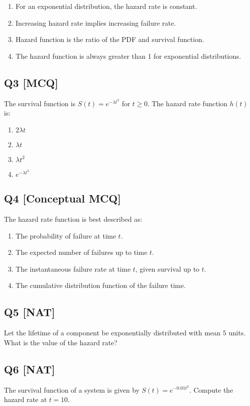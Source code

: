 \begin{enumerate}[label=(\alph*)]
\item For an exponential distribution, the hazard rate is constant.
\item Increasing hazard rate implies increasing failure rate.
\item Hazard function is the ratio of the PDF and survival function.
\item The hazard function is always greater than 1 for exponential distributions.
\end{enumerate}

\subsection*{Q3 [MCQ]}
The survival function is $S(t) = e^{-\lambda t^2}$ for $t \geq 0$. The hazard rate function $h(t)$ is:

\begin{enumerate}[label=(\alph*)]
\item $2\lambda t$
\item $\lambda t$
\item $\lambda t^2$
\item $e^{-\lambda t^2}$
\end{enumerate}

\subsection*{Q4 [Conceptual MCQ]}
The hazard rate function is best described as:

\begin{enumerate}[label=(\alph*)]
\item The probability of failure at time $t$.
\item The expected number of failures up to time $t$.
\item The instantaneous failure rate at time $t$, given survival up to $t$.
\item The cumulative distribution function of the failure time.
\end{enumerate}

\subsection*{Q5 [NAT]}
Let the lifetime of a component be exponentially distributed with mean $5$ units. What is the value of the hazard rate?

\subsection*{Q6 [NAT]}
The survival function of a system is given by $S(t) = e^{-0.01t^2}$. Compute the hazard rate at $t = 10$.

